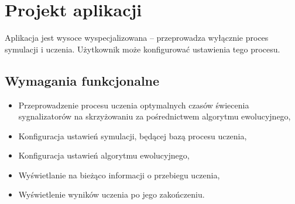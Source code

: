 \chapter*{Projekt aplikacji}
Aplikacja jest wysoce wyspecjalizowana -- przeprowadza wyłącznie proces symulacji i uczenia. Użytkownik może konfigurować ustawienia tego procesu.
\section*{Wymagania funkcjonalne}
\begin{itemize}
	\item Przeprowadzenie procesu uczenia optymalnych czasów świecenia sygnalizatorów na skrzyżowaniu za pośrednictwem algorytmu ewolucyjnego,
	\item Konfiguracja ustawień symulacji, będącej bazą procesu uczenia,
	\item Konfiguracja ustawień algorytmu ewolucyjnego,
	\item Wyświetlanie na bieżąco informacji o przebiegu uczenia,
	\item Wyświetlenie wyników uczenia po jego zakończeniu.
\end{itemize}
